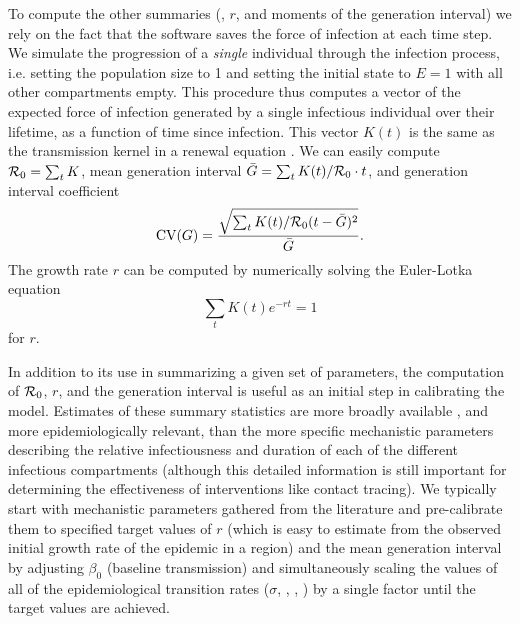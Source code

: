 \documentclass[12pt]{article}\usepackage[]{graphicx}\usepackage[]{color}
\begin{document}
To compute the other summaries (\Rzero, $r$, and moments of the generation interval) we rely on the fact that the software saves the force of infection at each time step. We simulate the progression of a \emph{single} individual through the infection process, i.e. setting the population size to 1 and setting the initial state to $E=1$ with all other compartments empty. This procedure thus computes a vector of the expected force of infection generated by a single infectious individual over their lifetime, as a function of time since infection. This vector $K(t)$ is the same as the transmission kernel in a renewal equation \cite{Cham+18}. We can easily compute ${\mathcal R}_0 = \sum_t K$, mean generation interval  $\bar G = \sum_t K(t)/{\mathcal R}_0 \cdot t$, and generation interval coefficient
\[
\textrm{CV}(G) = \frac{\sqrt{\sum_t K(t)/{\mathcal R}_0 (t- \bar G)^2}}{\bar G} .
\]
The growth rate $r$ can be computed by numerically solving the Euler-Lotka equation
\[
\sum_t  K(t) e^{-r t} = 1
\]
for $r$.


In addition to its use in summarizing a given set of parameters, the computation of ${\mathcal R}_0$, $r$, and the generation interval is useful as an initial step in calibrating the model. Estimates of these summary statistics are more broadly available , and more epidemiologically relevant, than the more specific mechanistic parameters describing the relative infectiousness and duration of each of the different infectious compartments (although this detailed information is still important for determining the effectiveness of interventions like contact tracing). We typically start with mechanistic parameters gathered from the literature and pre-calibrate them to specified target values of $r$ (which is easy to estimate from the observed initial growth rate of the epidemic in a region) and the mean generation interval by adjusting $\beta_0$ (baseline transmission) and simultaneously scaling the values of all of the epidemiological transition rates ($\sigma$, , , ) by a single factor until the target values are achieved.
\end{document}
